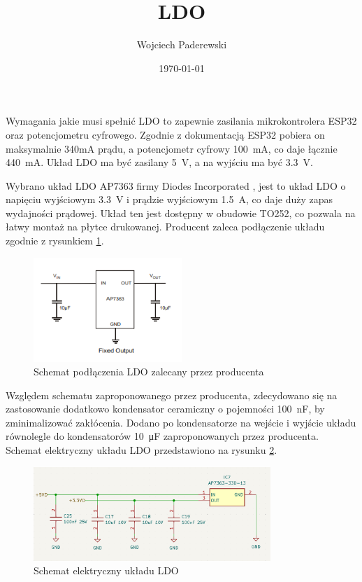 \documentclass[../../main.tex]{subfiles}
\author{Wojciech Paderewski}
\date{\today}
\title{LDO}
\begin{document}
Wymagania jakie musi spełnić LDO to zapewnie zasilania mikrokontrolera ESP32 oraz potencjometru cyfrowego.
Zgodnie z dokumentacją ESP32 \cite{st:esp32} pobiera on maksymalnie 340mA prądu, a potencjometr cyfrowy \cite{st:potencjometr} \SI{100}{\milli\ampere},
co daje łącznie \SI{440}{\milli\ampere}. Układ LDO ma być zasilany \SI{5}{\volt}, a na wyjściu ma być \SI{3.3}{\volt}.

Wybrano układ LDO AP7363 firmy Diodes Incorporated \cite{st:ldo}, jest to układ LDO o napięciu wyjściowym \SI{3.3}{\volt} i prądzie wyjściowym \SI{1.5}{\ampere},
co daje duży zapas wydajności prądowej. Układ ten jest dostępny w obudowie TO252, co pozwala na łatwy montaż na płytce drukowanej. Producent zaleca podłączenie układu
zgodnie z rysunkiem \ref{fig:ldo_datasheet}.

\begin{figure}[H]
    \centering
    \includegraphics[width=0.5\textwidth]{ldo_datasheet.png}
    \caption{Schemat podłączenia LDO zalecany przez producenta \cite{st:ldo}}
    \label{fig:ldo_datasheet}
\end{figure}

Względem schematu zaproponowanego przez producenta, zdecydowano się na zastosowanie dodatkowo kondensator ceramiczny o pojemności \SI{100}{\nano\farad}, by zminimalizować zakłócenia.
Dodano po kondensatorze na wejście i wyjście układu równolegle do kondensatorów \SI{10}{\micro\farad} zaproponowanych przez producenta. 
Schemat elektryczny układu LDO przedstawiono na rysunku \ref{fig:ldo}.

\begin{figure}[H]
    \centering
    \includegraphics[width=0.8\textwidth]{LDO.png}
    \caption{Schemat elektryczny układu LDO}
    \label{fig:ldo}
\end{figure}
\end{document}
